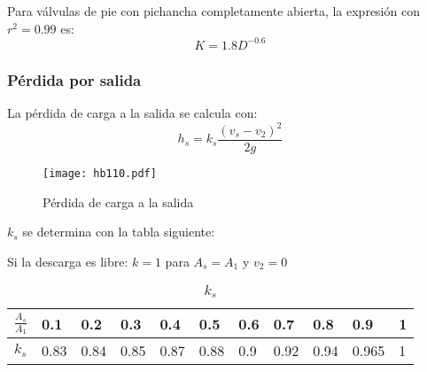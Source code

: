 Para válvulas de pie con pichancha completamente abierta, la expresión con $r^2=0.99$ es:
\begin{equation}
    K = 1.8D^{ - 0.6}
\end{equation}

\subsubsection{Pérdida por salida}

La pérdida de carga a la salida se calcula con:
\begin{equation}
    h_s = k_s\frac{\left(v_s - v_2\right)^2}{2g}
\end{equation}
\begin{figure}[h!]
\centering
  \texttt{[image: hb110.pdf]}
  \caption{Pérdida de carga a la salida}
  \label{hb110}
\end{figure}

$k_s$ se determina con la tabla siguiente:

Si la descarga es libre: $k=1$ para $A_s=A_1$ y $v_2=0$

\begin{table}[h!]
    \centering
    \begin{tabular}{@{}lllllllllll@{}}
    \toprule
    $\frac{A_s}{A_1}$ & 0.1  & 0.2  & 0.3  & 0.4  & 0.5  & 0.6 & 0.7  & 0.8  & 0.9   & 1 \\ \midrule
    $k_s$             & 0.83 & 0.84 & 0.85 & 0.87 & 0.88 & 0.9 & 0.92 & 0.94 & 0.965 & 1 \\ \bottomrule
    \end{tabular}
    \caption{$k_s$}
    \label{tabhb24}
    \end{table}

